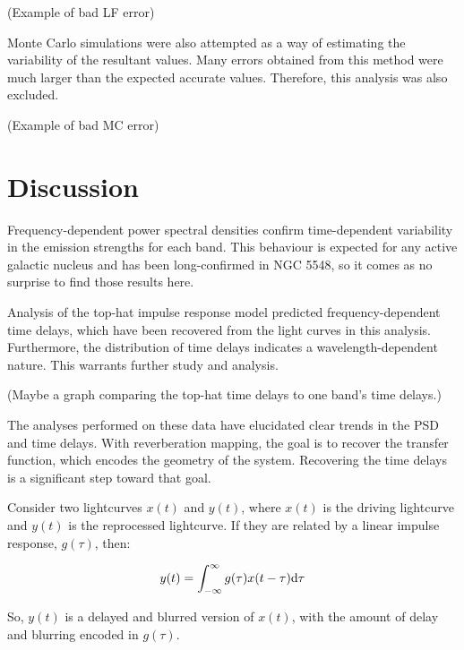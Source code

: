 \documentclass[11pt,letterpaper,fleqn]{article}
\begin{document}
	(Example of bad LF error)

	Monte Carlo simulations were also attempted as a way of estimating the
	variability of the resultant values. Many errors obtained from this method
	were much larger than the expected accurate values. Therefore, this analysis
	was also excluded.

	(Example of bad MC error)


\section{Discussion}
Frequency-dependent power spectral densities confirm time-dependent variability
in the emission strengths for each band. This behaviour is expected for
any active galactic nucleus and has been long-confirmed in NGC 5548, so
it comes as no surprise to find those results here. 

Analysis of the top-hat impulse response model predicted frequency-dependent
time delays, which have been recovered from the light curves in this analysis.
Furthermore, the distribution of time delays indicates a wavelength-dependent
nature. This warrants further study and analysis.

(Maybe a graph comparing the top-hat time delays to one band's time delays.)

The analyses performed on these data have elucidated clear trends in the PSD
and time delays. With reverberation mapping, the goal is to recover the transfer
function, which encodes the geometry of the system. Recovering the time delays
is a significant step toward that goal. 








Consider two lightcurves $x(t)$ and $y(t)$, where $x(t)$ is the driving lightcurve and $y(t)$ is the reprocessed lightcurve.  If they are related by a linear impulse response, $g(\tau)$, then: 







\begin{equation}
y(t) = \int_{-\infty}^{\infty} g(\tau) x(t-\tau)  {\rm d}\tau
\end{equation} 

So, $y(t)$ is a delayed and blurred version of $x(t)$, with the amount of delay and blurring encoded in $g(\tau)$.
\end{document}
